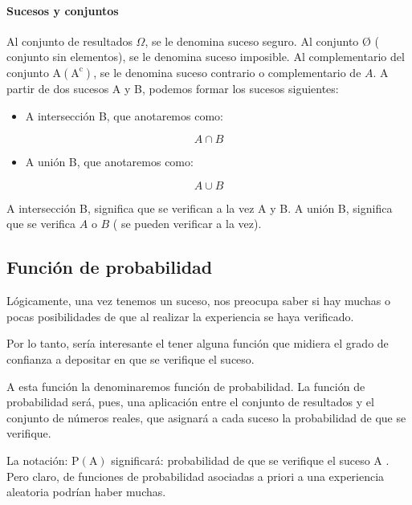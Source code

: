 \documentclass[
]{article}
\providecommand{\tightlist}{%
  \setlength{\itemsep}{0pt}\setlength{\parskip}{0pt}}
\begin{document}
\paragraph{Sucesos y conjuntos}\label{sucesos-y-conjuntos}

Al conjunto de resultados \(\Omega\), se le denomina suceso seguro. Al
conjunto Ø ( conjunto sin elementos), se le denomina suceso imposible.
Al complementario del conjunto
\(\mathrm{A}\left(\mathrm{A}^{\mathrm{c}}\right)\), se le denomina suceso
contrario o complementario de \(A\). A partir de dos sucesos A y B,
podemos formar los sucesos siguientes:

\begin{itemize}
\tightlist
\item
  A intersección B, que anotaremos como:
\end{itemize}

\[
A \cap B
\]

\begin{itemize}
\tightlist
\item
  A unión B, que anotaremos como:
\end{itemize}

\[
A \cup B
\]

A intersección B, significa que se verifican a la vez A y B. A unión B,
significa que se verifica \(A\) o \(B\) ( se pueden verificar a la vez).

\subsection{Función de probabilidad}\label{funciuxf3n-de-probabilidad}

Lógicamente, una vez tenemos un suceso, nos preocupa saber si hay muchas
o pocas posibilidades de que al realizar la experiencia se haya
verificado.

Por lo tanto, sería interesante el tener alguna función que midiera el
grado de confianza a depositar en que se verifique el suceso.

A esta función la denominaremos función de probabilidad. La función de
probabilidad será, pues, una aplicación entre el conjunto de resultados
y el conjunto de números reales, que asignará a cada suceso la
probabilidad de que se verifique.

La notación: \(\mathrm{P}(\mathrm{A})\) significará: probabilidad de que
se verifique el suceso A . Pero claro, de funciones de probabilidad
asociadas a priori a una experiencia aleatoria podrían haber muchas.
\end{document}
